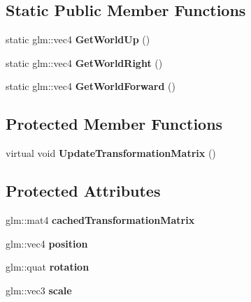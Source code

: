\subsection*{Static Public Member Functions}
\begin{DoxyCompactItemize}
\item 
\hypertarget{class_scene_object_a334a5fb4e91d85fe6a046bd83dd235d3}{}static glm\+::vec4 {\bfseries Get\+World\+Up} ()\label{class_scene_object_a334a5fb4e91d85fe6a046bd83dd235d3}

\item 
\hypertarget{class_scene_object_a46d0ffed082f7bd515b9550ef9f9a86a}{}static glm\+::vec4 {\bfseries Get\+World\+Right} ()\label{class_scene_object_a46d0ffed082f7bd515b9550ef9f9a86a}

\item 
\hypertarget{class_scene_object_a6fa71efda895933be4ee684745980e68}{}static glm\+::vec4 {\bfseries Get\+World\+Forward} ()\label{class_scene_object_a6fa71efda895933be4ee684745980e68}

\end{DoxyCompactItemize}
\subsection*{Protected Member Functions}
\begin{DoxyCompactItemize}
\item 
\hypertarget{class_scene_object_a20e31da3f9d2765de50cdb2d637ae6c9}{}virtual void {\bfseries Update\+Transformation\+Matrix} ()\label{class_scene_object_a20e31da3f9d2765de50cdb2d637ae6c9}

\end{DoxyCompactItemize}
\subsection*{Protected Attributes}
\begin{DoxyCompactItemize}
\item 
\hypertarget{class_scene_object_aac3f13eea8a7b455e8cffc6eceef211c}{}glm\+::mat4 {\bfseries cached\+Transformation\+Matrix}\label{class_scene_object_aac3f13eea8a7b455e8cffc6eceef211c}

\item 
\hypertarget{class_scene_object_ab4aa9bed778001970c38ea11ef34b285}{}glm\+::vec4 {\bfseries position}\label{class_scene_object_ab4aa9bed778001970c38ea11ef34b285}

\item 
\hypertarget{class_scene_object_ae27376aaca87543a75b5a2cd0daf6e2f}{}glm\+::quat {\bfseries rotation}\label{class_scene_object_ae27376aaca87543a75b5a2cd0daf6e2f}

\item 
\hypertarget{class_scene_object_a62c686b880fe4f58dec64a409e56de26}{}glm\+::vec3 {\bfseries scale}\label{class_scene_object_a62c686b880fe4f58dec64a409e56de26}

\end{DoxyCompactItemize}
